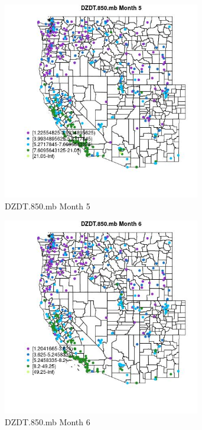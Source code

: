 \begin{figure} 
\centering  
\includegraphics[width=0.77\textwidth]{Code_Outputs/ML_input_report_ML_input_PM25_Step5_part_d_de_duplicated_aves_ML_input_MapObsMo5DZDT850mb.jpg} 
\caption{\label{fig:ML_input_report_ML_input_PM25_Step5_part_d_de_duplicated_aves_ML_inputMapObsMo5DZDT850mb}DZDT.850.mb Month 5} 
\end{figure} 
 

\begin{figure} 
\centering  
\includegraphics[width=0.77\textwidth]{Code_Outputs/ML_input_report_ML_input_PM25_Step5_part_d_de_duplicated_aves_ML_input_MapObsMo6DZDT850mb.jpg} 
\caption{\label{fig:ML_input_report_ML_input_PM25_Step5_part_d_de_duplicated_aves_ML_inputMapObsMo6DZDT850mb}DZDT.850.mb Month 6} 
\end{figure} 
 

